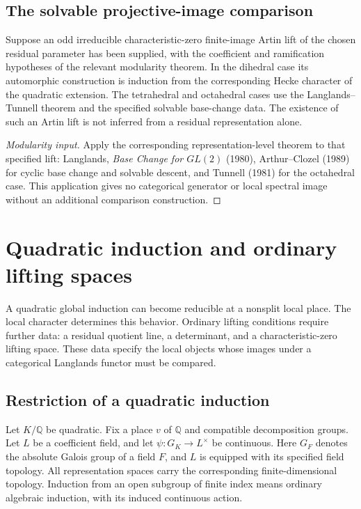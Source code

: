\subsection{The solvable projective-image comparison}
\begin{lemma}
\label{v4-arith:w6-e:lem:AC-dihedral}
Suppose an odd irreducible characteristic-zero finite-image Artin
lift of the chosen residual parameter has been supplied, with the
coefficient and ramification hypotheses of the relevant modularity
theorem. In the dihedral case its automorphic construction is
induction from the corresponding Hecke character of the quadratic
extension. The tetrahedral and octahedral cases use the
Langlands--Tunnell theorem and the specified solvable base-change data.
The existence of such an Artin lift is not inferred from a residual
representation alone.
\end{lemma}
\begin{proof}[Modularity input]
Apply the corresponding representation-level theorem to that specified
lift: Langlands, \emph{Base Change for $GL(2)$} (1980),
Arthur--Clozel (1989) for cyclic base change and solvable descent,
and Tunnell (1981) for the octahedral case. This application gives
no categorical generator or local spectral image without an additional
comparison construction.
\end{proof}

\section{Quadratic induction and ordinary lifting spaces}

A quadratic global induction can become reducible at a nonsplit local
place. The local character determines this behavior. Ordinary lifting
conditions require further data: a residual quotient line, a determinant,
and a characteristic-zero lifting space. These data specify the local
objects whose images under a categorical Langlands functor must be
compared.

\subsection{Restriction of a quadratic induction}

Let $K/\mathbb Q$ be quadratic. Fix a place $v$ of $\mathbb Q$ and
compatible decomposition groups. Let $L$ be a coefficient field, and
let $\psi:G_K\to L^\times$ be continuous. Here $G_F$ denotes the absolute Galois group of a field $F$,
and $L$ is equipped with its specified field topology. All representation
spaces carry the corresponding finite-dimensional topology. Induction from an open subgroup
of finite index means ordinary algebraic induction, with its induced
continuous action.

